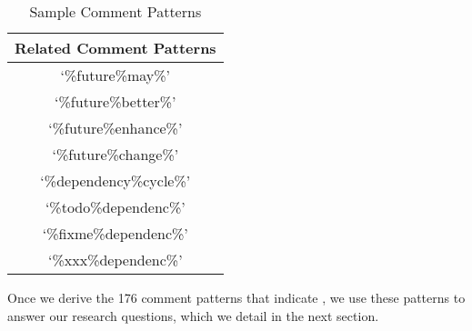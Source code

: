 \begin{table}[t!]
    \begin{center}
        \caption{Sample \SADTD Comment Patterns}
        \vspace{-2mm}
        \label{tab:dictionarySample}
        \begin{tabular}{ c }
            \toprule
            \textbf{Related Comment Patterns} \\ 
            \midrule
                 `\%future\%may\%'       \\
                 `\%future\%better\%'  \\
                 `\%future\%enhance\%' \\ 
                 `\%future\%change\%'  \\   
             `\%dependency\%cycle\%'  \\
             `\%todo\%dependenc\%'    \\
             `\%fixme\%dependenc\%'   \\
             `\%xxx\%dependenc\%'    \\
            \bottomrule             
        \end{tabular}
    \end{center}    
\end{table}

Once we derive the 176 comment patterns that indicate \SADTD, we use these patterns to answer our research questions, which we detail in the next section.